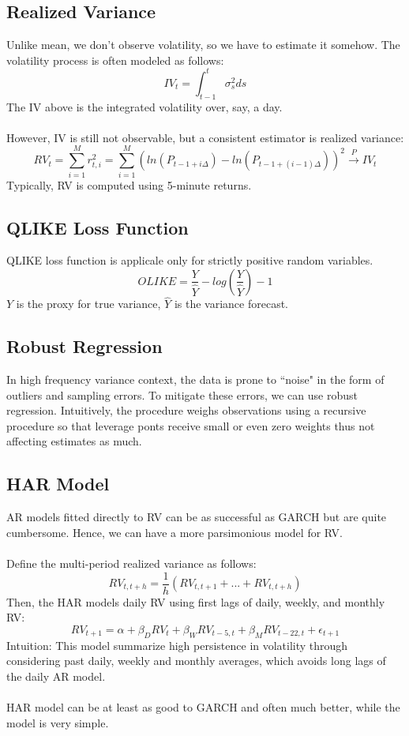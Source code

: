 \documentclass{article}
\begin{document}
\subsection{Realized Variance}
Unlike mean, we don't observe volatility, so we have to estimate it somehow. The volatility process is often modeled as follows:
$$IV_t = \int_{t-1}^t \sigma_s^2 ds$$
The IV above is the integrated volatility over, say, a day.\\
\\
However, IV is still not observable, but a consistent estimator is realized variance:
$$RV_t = \sum_{i=1}^M r_{t,i}^2 = \sum_{i=1}^M (ln(P_{t-1+i\Delta}) - ln(P_{t-1+(i-1)\Delta}))^2 \xrightarrow{P} IV_t$$
Typically, RV is computed using 5-minute returns.

\subsection{QLIKE Loss Function}
QLIKE loss function is applicale only for strictly positive random variables.
$$OLIKE = \frac{Y}{\hat{Y}} - log(\frac{Y}{\hat{Y}}) - 1$$
$Y$ is the proxy for true variance, $\hat{Y}$ is the variance forecast.

\subsection{Robust Regression}
In high frequency variance context, the data is prone to ``noise" in the form of outliers and sampling errors. To mitigate these errors, we can use robust regression. Intuitively, the procedure weighs observations using a recursive procedure so that leverage ponts receive small or even zero weights thus not affecting estimates as much.

\subsection{HAR Model}
AR models fitted directly to RV can be as successful as GARCH but are quite cumbersome. Hence, we can have a more parsimonious model for RV.\\
\\
Define the multi-period realized variance as follows:
$$RV_{t, t+h} = \frac{1}{h}(RV_{t, t+1} + ... + RV_{t, t+h})$$
Then, the HAR models daily RV using first lags of daily, weekly, and monthly RV:
$$RV_{t+1} = \alpha + \beta_D RV_t + \beta_W RV_{t-5, t} + \beta_M RV_{t-22, t} + \epsilon_{t+1}$$
Intuition: This model summarize high persistence in volatility through considering past daily, weekly and monthly averages, which avoids long lags of the daily AR model.\\
\\
HAR model can be at least as good to GARCH and often much better, while the model is very simple.
\end{document}
